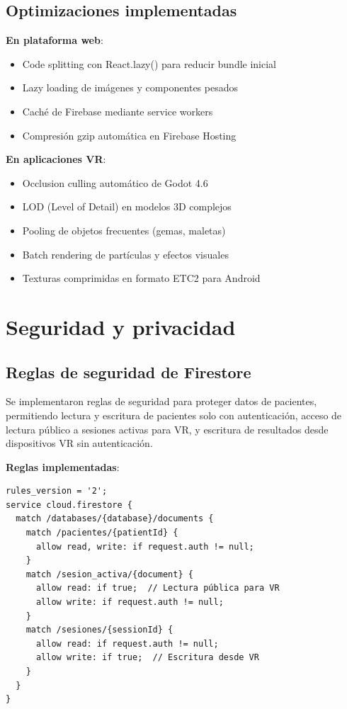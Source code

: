 \subsection{Optimizaciones implementadas}

\textbf{En plataforma web}:
\begin{itemize}
    \item Code splitting con React.lazy() para reducir bundle inicial
    \item Lazy loading de imágenes y componentes pesados
    \item Caché de Firebase mediante service workers
    \item Compresión gzip automática en Firebase Hosting
\end{itemize}

\textbf{En aplicaciones VR}:
\begin{itemize}
    \item Occlusion culling automático de Godot 4.6
    \item LOD (Level of Detail) en modelos 3D complejos
    \item Pooling de objetos frecuentes (gemas, maletas)
    \item Batch rendering de partículas y efectos visuales
    \item Texturas comprimidas en formato ETC2 para Android
\end{itemize}

\section{Seguridad y privacidad}

\subsection{Reglas de seguridad de Firestore}

Se implementaron reglas de seguridad para proteger datos de pacientes, permitiendo lectura y escritura de pacientes solo con autenticación, acceso de lectura público a sesiones activas para VR, y escritura de resultados desde dispositivos VR sin autenticación.

\textbf{Reglas implementadas}:
\begin{verbatim}
rules_version = '2';
service cloud.firestore {
  match /databases/{database}/documents {
    match /pacientes/{patientId} {
      allow read, write: if request.auth != null;
    }
    match /sesion_activa/{document} {
      allow read: if true;  // Lectura pública para VR
      allow write: if request.auth != null;
    }
    match /sesiones/{sessionId} {
      allow read: if request.auth != null;
      allow write: if true;  // Escritura desde VR
    }
  }
}
\end{verbatim}

